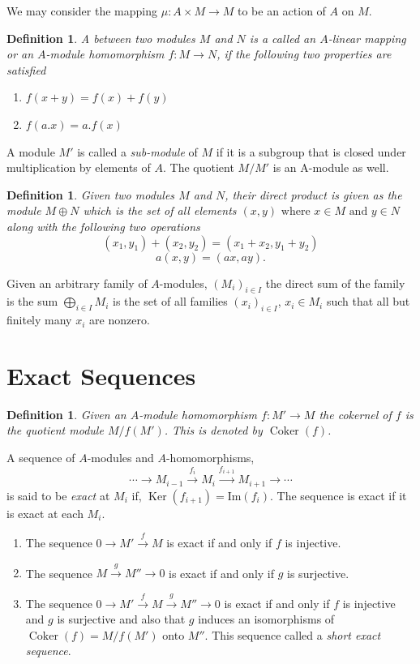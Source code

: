 \documentclass[]{report}
\newtheorem{defn}[theorem]{Definition}
\DeclareMathOperator\Ker{Ker}
\DeclareMathOperator\Coker{Coker}
\begin{document}
We may consider the mapping $\mu: A \times M \rightarrow M$ to be an action of $A$ on $M$.

\begin{defn}
    A  between two modules $M$ and $N$ is a called an $A$-\textit{linear mapping} or an $A$-module homomorphism $f:M\rightarrow N$, if the following two properties are satisfied
\begin{enumerate}
    \item $f(x+y) = f(x) + f(y)$
    \item $f(a.x) = a.f(x)$
\end{enumerate}
\end{defn}

A module $M'$ is called a \textit{sub-module} of $M$ if it is a subgroup that is closed under multiplication by elements of $A$. The quotient $M/M'$ is an A-module as well.

\begin{defn}
    Given two modules $M$ and $N$, their direct product is given as the module $M\oplus N$ which is the set of all elements $(x,y) \text{ where } x\in M \text{ and } y\in N$ along with the following two operations 
$$(x_1,y_1) + (x_2,y_2) = (x_1+x_2, y_1+y_2)$$
$$a(x,y) = (ax, ay).$$
\end{defn}

Given an arbitrary family of $A$-modules, $(M_i)_{i\in I}$ the direct sum of the family is the sum $\bigoplus_{i\in I} M_i$ is the set of all families $(x_i)_{i\in I}$, $x_i\in M_i$ such that all but finitely many $x_i$ are nonzero.

\section{Exact Sequences}

\begin{defn}
    Given an $A$-module homomorphism $f: M' \rightarrow M$ the cokernel of $f$ is the quotient module $M/f(M')$. This is denoted by $\Coker(f)$.
\end{defn}


A sequence of $A$-modules and $A$-homomorphisms,
$$\cdots \rightarrow M_{i-1} \xrightarrow{f_i} M_i \xrightarrow{f_{i+1}} M_{i+1} \rightarrow \cdots$$ 
is said to be \textit{exact} at $M_i$ if, $\Ker(f_{i+1}) = \text{Im}(f_i)$. The sequence is exact if it is exact at each $M_i$. 

\begin{enumerate}
    \item The sequence $0 \rightarrow M' \xrightarrow{f} M$ is exact if and only if $f$ is injective.
    \item The sequence $M \xrightarrow{g} M'' \rightarrow 0$ is exact if and only if $g$ is surjective. 
    \item The sequence $0 \rightarrow M' \xrightarrow{f} M \xrightarrow{g} M'' \rightarrow 0$ is exact if and only if $f$ is injective and $g$ is surjective and also that $g$ induces an isomorphisms of $\Coker(f) = M/f(M')$ onto $M''$. This sequence called a \textit{short exact sequence}.
\end{enumerate}
\end{document}
